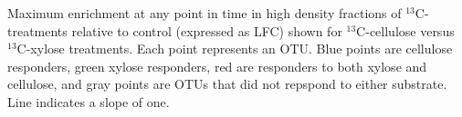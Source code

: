 Maximum enrichment at any point in time in high density fractions
of $^{13}$C-treatments relative to control (expressed as LFC) shown
for $^{13}$C-cellulose versus $^{13}$C-xylose treatments. Each point
represents an OTU. Blue points are cellulose responders, green xylose
responders, red are responders to both xylose and cellulose, and gray points
are OTUs that did not repspond to either substrate. Line indicates a slope of
one. 

